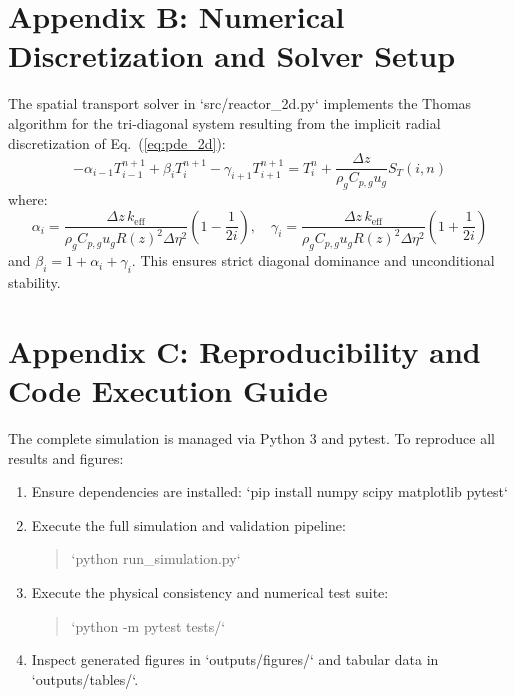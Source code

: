 \documentclass[11pt,a4paper]{article}
\begin{document}
\section{Appendix B: Numerical Discretization and Solver Setup}
The spatial transport solver in `src/reactor_2d.py` implements the Thomas algorithm for the tri-diagonal system resulting from the implicit radial discretization of Eq.~(\ref{eq:pde_2d}):
\begin{equation}
    -\alpha_{i-1} T_{i-1}^{n+1} + \beta_i T_i^{n+1} - \gamma_{i+1} T_{i+1}^{n+1} = T_i^n + \frac{\Delta z}{\rho_g C_{p,g} u_g} S_T(i, n)
\end{equation}
where:
\begin{equation}
    \alpha_i = \frac{\Delta z \, k_{\text{eff}}}{\rho_g C_{p,g} u_g R(z)^2 \Delta \eta^2} \left(1 - \frac{1}{2 i}\right), \quad \gamma_i = \frac{\Delta z \, k_{\text{eff}}}{\rho_g C_{p,g} u_g R(z)^2 \Delta \eta^2} \left(1 + \frac{1}{2 i}\right)
\end{equation}
and $\beta_i = 1 + \alpha_i + \gamma_i$. This ensures strict diagonal dominance and unconditional stability.

\section{Appendix C: Reproducibility and Code Execution Guide}
The complete simulation is managed via Python 3 and pytest. To reproduce all results and figures:
\begin{enumerate}
    \item Ensure dependencies are installed: `pip install numpy scipy matplotlib pytest`
    \item Execute the full simulation and validation pipeline:
    \begin{quote}
        `python run_simulation.py`
    \end{quote}
    \item Execute the physical consistency and numerical test suite:
    \begin{quote}
        `python -m pytest tests/`
    \end{quote}
    \item Inspect generated figures in `outputs/figures/` and tabular data in `outputs/tables/`.
\end{enumerate}
\end{document}
